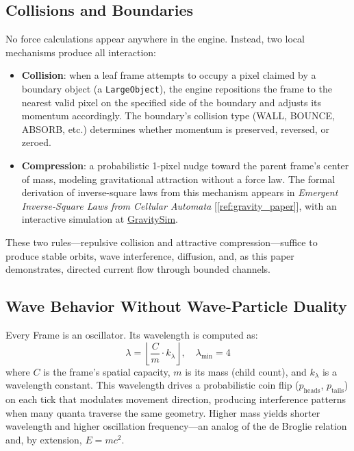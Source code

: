 \documentclass[11pt,a4paper]{article}
\begin{document}
\subsection{Collisions and Boundaries}

No force calculations appear anywhere in the engine. Instead, two local mechanisms produce all interaction:

\begin{itemize}
    \item \textbf{Collision}: when a leaf frame attempts to occupy a pixel claimed by a boundary object (a \texttt{LargeObject}), the engine repositions the frame to the nearest valid pixel on the specified side of the boundary and adjusts its momentum accordingly. The boundary's collision type (WALL, BOUNCE, ABSORB, etc.) determines whether momentum is preserved, reversed, or zeroed.
    \item \textbf{Compression}: a probabilistic 1-pixel nudge toward the parent frame's center of mass, modeling gravitational attraction without a force law. The formal derivation of inverse-square laws from this mechanism appears in \emph{Emergent Inverse-Square Laws from Cellular Automata} [\ref{ref:gravity_paper}], with an interactive simulation at \href{https://eabadir.github.io/EGPT/www/GravitySim/index.html}{GravitySim}.
\end{itemize}

These two rules---repulsive collision and attractive compression---suffice to produce stable orbits, wave interference, diffusion, and, as this paper demonstrates, directed current flow through bounded channels.

\subsection{Wave Behavior Without Wave-Particle Duality}
\label{subsec:wave}

Every Frame is an oscillator. Its wavelength is computed as:
\begin{equation}
    \lambda = \left\lfloor \frac{C}{m} \cdot k_\lambda \right\rfloor, \quad \lambda_{\min} = 4
\end{equation}
where $C$ is the frame's spatial capacity, $m$ is its mass (child count), and $k_\lambda$ is a wavelength constant. This wavelength drives a probabilistic coin flip ($p_{\text{heads}}$, $p_{\text{tails}}$) on each tick that modulates movement direction, producing interference patterns when many quanta traverse the same geometry. Higher mass yields shorter wavelength and higher oscillation frequency---an analog of the de Broglie relation and, by extension, $E = mc^2$.
\end{document}
